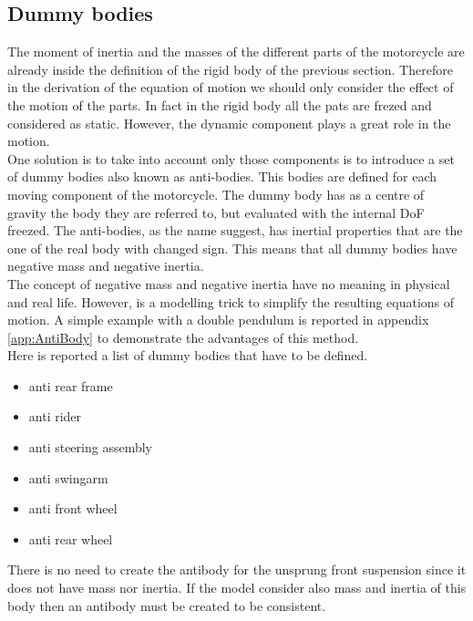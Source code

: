 \subsection{Dummy bodies}
\label{subsec:Dummy}
%
The moment of inertia and the masses of the different parts of the motorcycle are already inside the definition of the rigid body of the previous section. Therefore in the derivation of the equation of motion we should only consider the effect of the motion of the parts. In fact in the rigid body all the pats are frezed and considered as static. However, the dynamic component plays a great role in the motion.\\ 
One solution is to take into account only those components is to introduce a set of dummy bodies also known as anti-bodies. This bodies are defined for each moving component of the motorcycle. The dummy body has as a centre of gravity the body they are referred to, but evaluated with the internal DoF freezed. The anti-bodies, as the name suggest, has inertial properties that are the one of the real body with changed sign. This means that all dummy bodies have negative mass and negative inertia. \\
The concept of negative mass and negative inertia have no meaning in physical and real life. However, is a modelling trick to simplify the resulting equations of motion. A simple example with a double pendulum is reported in appendix \ref{app:AntiBody} to demonstrate the advantages of this method.\\
Here is reported a list of dummy bodies that have to be defined.
%
\begin{itemize}
    \setlength{\itemsep}{0pt}
    \item anti rear frame
    \item anti rider 
    \item anti steering assembly
    \item anti swingarm 
    \item anti front wheel
    \item anti rear wheel
\end{itemize}
%
There is no need to create the antibody for the unsprung front suspension since it does not have mass nor inertia. If the model consider also mass and inertia of this body then an antibody must be created to be consistent.
%
